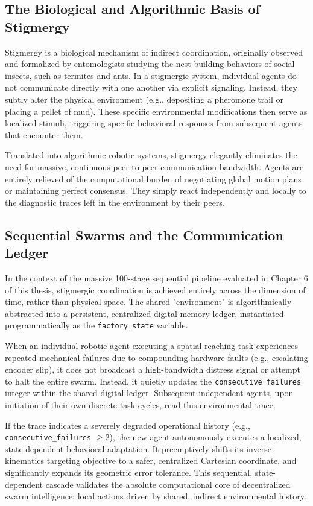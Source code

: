 \documentclass[12pt,a4paper,oneside]{report}
\begin{document}
\subsection{The Biological and Algorithmic Basis of Stigmergy}

Stigmergy is a biological mechanism of indirect coordination, originally observed and formalized by entomologists studying the nest-building behaviors of social insects, such as termites and ants. In a stigmergic system, individual agents do not communicate directly with one another via explicit signaling. Instead, they subtly alter the physical environment (e.g., depositing a pheromone trail or placing a pellet of mud). These specific environmental modifications then serve as localized stimuli, triggering specific behavioral responses from subsequent agents that encounter them. 

Translated into algorithmic robotic systems, stigmergy elegantly eliminates the need for massive, continuous peer-to-peer communication bandwidth. Agents are entirely relieved of the computational burden of negotiating global motion plans or maintaining perfect consensus. They simply react independently and locally to the diagnostic traces left in the environment by their peers.

\subsection{Sequential Swarms and the Communication Ledger}

In the context of the massive 100-stage sequential pipeline evaluated in Chapter 6 of this thesis, stigmergic coordination is achieved entirely across the dimension of time, rather than physical space. The shared "environment" is algorithmically abstracted into a persistent, centralized digital memory ledger, instantiated programmatically as the \texttt{factory\_state} variable. 

When an individual robotic agent executing a spatial reaching task experiences repeated mechanical failures due to compounding hardware faults (e.g., escalating encoder slip), it does not broadcast a high-bandwidth distress signal or attempt to halt the entire swarm. Instead, it quietly updates the \texttt{consecutive\_failures} integer within the shared digital ledger. Subsequent independent agents, upon initiation of their own discrete task cycles, read this environmental trace. 

If the trace indicates a severely degraded operational history (e.g., \texttt{consecutive\_failures} $\geq 2$), the new agent autonomously executes a localized, state-dependent behavioral adaptation. It preemptively shifts its inverse kinematics targeting objective to a safer, centralized Cartesian coordinate, and significantly expands its geometric error tolerance. This sequential, state-dependent cascade validates the absolute computational core of decentralized swarm intelligence: local actions driven by shared, indirect environmental history.
\end{document}

